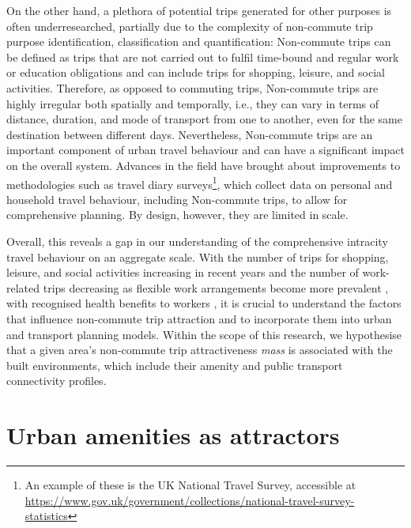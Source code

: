 On the other hand, a plethora of potential trips generated for other purposes is often underresearched, partially due to the complexity of non-commute trip purpose identification, classification and quantification: Non-commute trips can be defined as trips that are not carried out to fulfil time-bound and regular work or education obligations and can include trips for shopping, leisure, and social activities. Therefore, as opposed to commuting trips, Non-commute trips are highly irregular both spatially and temporally, i.e., they can vary in terms of distance, duration, and mode of transport from one to another, even for the same destination between different days. Nevertheless, Non-commute trips are an important component of urban travel behaviour and can have a significant impact on the overall system. Advances in the field have brought about improvements to methodologies such as travel diary surveys\footnote{An example of these is the UK National Travel Survey, accessible at \url{https://www.gov.uk/government/collections/national-travel-survey-statistics}}, which collect data on personal and household travel behaviour, including Non-commute trips, to allow for comprehensive planning. By design, however, they are limited in scale.

Overall, this reveals a gap in our understanding of the comprehensive intracity travel behaviour on an aggregate scale. With the number of trips for shopping, leisure, and social activities increasing in recent years and the number of work-related trips decreasing as flexible work arrangements become more prevalent \citep{wohnerWorkFlexiblyTravel2022}, with recognised health benefits to workers \citep{macleodCommutingWorkPostpandemic2022}, it is crucial to understand the factors that influence non-commute trip attraction and to incorporate them into urban and transport planning models. Within the scope of this research, we hypothesise that a given area's non-commute trip attractiveness \textit{mass} is associated with the built environments, which include their amenity and public transport connectivity profiles. 

\section{Urban amenities as attractors}

